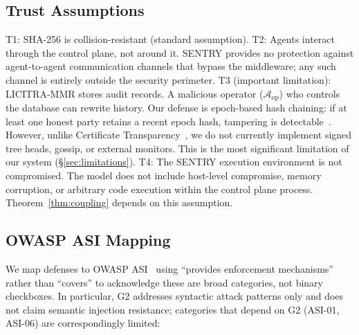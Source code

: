 \documentclass[11pt,a4paper]{article}
\begin{document}
\subsection{Trust Assumptions}\label{sec:trustassumptions}

T1: SHA-256 is collision-resistant (standard assumption). T2: Agents interact through the
control plane, not around it. SENTRY provides no protection against agent-to-agent
communication channels that bypass the middleware; any such channel is entirely outside the
security perimeter. T3 (important limitation): LICITRA-MMR stores audit records. A
malicious operator ($\mathcal{A}_{\mathrm{op}}$) who controls the database can rewrite history.
Our defense is epoch-based hash chaining: if at least one honest party retains a recent epoch
hash, tampering is detectable~\cite[Theorem~1]{licitrammr}. However, unlike Certificate
Transparency~\cite{ct}, we do not currently implement signed tree heads, gossip, or external
monitors. This is the most significant limitation of our system
(\S\ref{sec:limitations}). T4: The SENTRY execution environment is not compromised. The
model does not include host-level compromise, memory corruption, or arbitrary code execution
within the control plane process. Theorem~\ref{thm:coupling} depends on this assumption.

\subsection{OWASP ASI Mapping}

We map defenses to OWASP ASI~\cite{owasp} using ``provides enforcement mechanisms'' rather
than ``covers'' to acknowledge these are broad categories, not binary checkboxes. In
particular, G2 addresses syntactic attack patterns only and does not claim semantic injection
resistance; categories that depend on G2 (ASI-01, ASI-06) are correspondingly limited:
\end{document}
